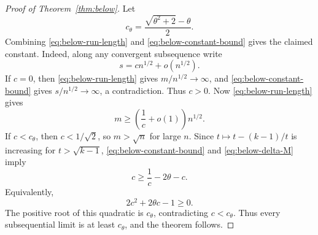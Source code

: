 \documentclass[10pt,a4paper]{amsart}
\numberwithin{equation}{section}
\begin{document}
\begin{proof}[Proof of Theorem~\ref{thm:below}]
Let
\begin{equation}\label{eq:below-ctheta}
        c_\theta=\frac{\sqrt{\theta^2+2}-\theta}{2}.
\end{equation}
Combining \eqref{eq:below-run-length} and \eqref{eq:below-constant-bound} gives the claimed constant.
Indeed, along any convergent subsequence write
\[
        s=c n^{1/2}+o(n^{1/2}).
\]
If $c=0$, then \eqref{eq:below-run-length} gives $m/n^{1/2}\to\infty$, and \eqref{eq:below-constant-bound} gives $s/n^{1/2}\to\infty$, a contradiction.
Thus $c>0$.
Now \eqref{eq:below-run-length} gives
\[
        m\ge \left(\frac1c+o(1)\right)n^{1/2}.
\]
If $c<c_\theta$, then $c<1/\sqrt2$, so $m>\sqrt n$ for large $n$.
Since $t\mapsto t-(k-1)/t$ is increasing for $t>\sqrt{k-1}$, \eqref{eq:below-constant-bound} and \eqref{eq:below-delta-M} imply
\[
        c
        \ge
        \frac1c-2\theta-c.
\]
Equivalently,
\[
        2c^2+2\theta c-1\ge0.
\]
The positive root of this quadratic is $c_\theta$, contradicting $c<c_\theta$.
Thus every subsequential limit is at least $c_\theta$, and the theorem follows.
\end{proof}
\end{document}
